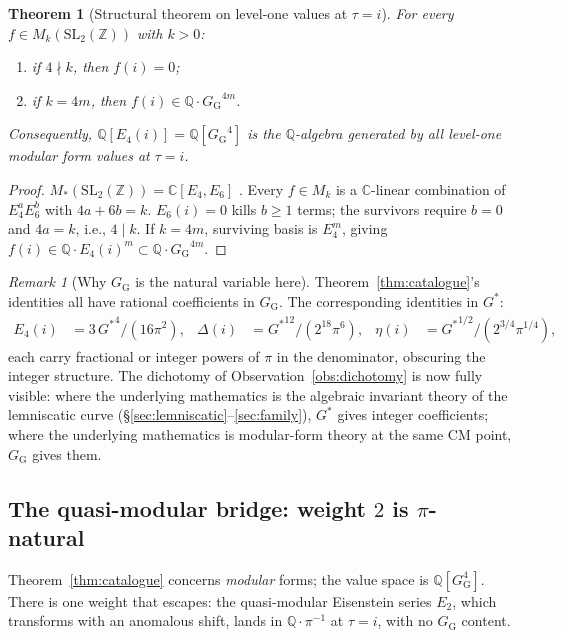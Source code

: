 \documentclass[11pt]{article}
\newtheorem{theorem}{Theorem}[section]
\theoremstyle{definition}
\theoremstyle{remark}
\newtheorem*{remark}{Remark}
\newcommand{\Gs}{G^{*}}
\newcommand{\GG}{G_{\!\scriptscriptstyle\mathrm{G}}}
\newcommand{\Z}{\mathbb{Z}}
\newcommand{\Q}{\mathbb{Q}}
\newcommand{\C}{\mathbb{C}}
\begin{document}
\begin{theorem}[Structural theorem on level-one values at $\tau = i$]\label{thm:level-one}
For every $f \in M_k(\mathrm{SL}_2(\Z))$ with $k > 0$:
\begin{enumerate}[label=\textup{(\roman*)}, leftmargin=*, itemsep=2pt]
\item if $4 \nmid k$, then $f(i) = 0$;
\item if $k = 4m$, then $f(i) \in \Q\cdot {\GG}^{4m}$.
\end{enumerate}
Consequently, $\Q[E_4(i)] = \Q[{\GG}^4]$ is the $\Q$-algebra generated by all
level-one modular form values at $\tau = i$.
\end{theorem}

\begin{proof}
$M_*(\mathrm{SL}_2(\Z)) = \C[E_4, E_6]$ \cite[\S{}III.3]{diamondshurman}. Every
$f \in M_k$ is a $\C$-linear combination of $E_4^a E_6^b$ with $4a + 6b = k$.
$E_6(i) = 0$ kills $b \geq 1$ terms; the survivors require $b = 0$ and
$4a = k$, i.e., $4 \mid k$. If $k = 4m$, surviving basis is $E_4^m$, giving
$f(i) \in \Q\cdot E_4(i)^m \subset \Q\cdot {\GG}^{4m}$.
\end{proof}

\begin{remark}[Why $\GG$ is the natural variable here]
Theorem~\ref{thm:catalogue}'s identities all have rational coefficients in
$\GG$. The corresponding identities in $\Gs$:
\begin{align*}
E_4(i) &= 3\,{\Gs}^4/(16\pi^2), &
\Delta(i) &= {\Gs}^{12}/(2^{18}\pi^6), &
\eta(i) &= {\Gs}^{1/2}/(2^{3/4}\pi^{1/4}),
\end{align*}
each carry fractional or integer powers of $\pi$ in the denominator,
obscuring the integer structure. The dichotomy of
Observation~\ref{obs:dichotomy} is now fully visible: where the underlying
mathematics is the algebraic invariant theory of the lemniscatic curve
(\S\ref{sec:lemniscatic}--\ref{sec:family}), $\Gs$ gives integer coefficients;
where the underlying mathematics is modular-form theory at the same CM point,
$\GG$ gives them.
\end{remark}

\subsection{The quasi-modular bridge: weight $2$ is $\pi$-natural}\label{sec:quasi}

Theorem~\ref{thm:catalogue} concerns \emph{modular} forms; the value space is
$\Q[\GG^{4}]$. There is one weight that escapes: the quasi-modular Eisenstein
series $E_2$, which transforms with an anomalous shift, lands in $\Q\cdot \pi^{-1}$
at $\tau = i$, with no $\GG$ content.
\end{document}
